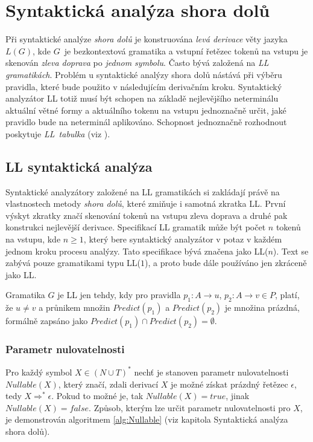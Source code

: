 \section{Syntaktická analýza shora dolů} \label{nadpisSAShoraDolu}
Při syntaktické analýze \emph{shora dolů} je konstruována \emph{levá derivace} věty jazyka $L(G)$, kde $G$~je bezkontextová gramatika a
vstupní řetězec tokenů na vstupu je skenován \emph{zleva doprava} po \emph{jednom symbolu}. Často bývá založená na \emph{LL gramatikách}.
Problém u syntaktické analýzy shora dolů nástává
při výběru pravidla, které bude použito v následujícím derivačním kroku. Syntaktický analyzátor LL totiž musí být schopen na základě nejlevějšího neterminálu
aktuální větné formy a aktuálního tokenu na vstupu jednoznačně určit, jaké pravidlo bude na neterminál aplikováno. Schopnost jednoznačně rozhodnout poskytuje
\emph{LL~tabulka} (viz \cite{Meduna:2008:ElementsOfCompilerDesign}).

\subsection*{LL syntaktická analýza}
Syntaktické analyzátory založené na LL gramatikách si zakládají právě na vlastnostech metody \emph{shora dolů}, které zmiňuje i samotná zkratka LL.
První výskyt zkratky  značí skenování tokenů na vstupu zleva doprava a druhé pak konstrukci nejlevější derivace. Specifikací LL gramatik může být
počet $n$ tokenů na vstupu, kde $n \geq 1$, který bere syntaktický analyzátor v potaz v každém jednom kroku procesu analýzy. Tato specifikace
bývá značena jako LL($n$). Text se zabývá pouze gramatikami typu LL($1$), a proto bude dále používáno jen zkráceně jako LL.
\begin{definice} \label{defLLGramatika}
  Gramatika $G$ je LL jen tehdy, kdy pro pravidla $p_1\!: A \rightarrow u$, \linebreak $p_2\!: A \rightarrow v \in P$, platí, že $u \neq v$ a průnikem množin $Predict(p_1)$
  a $Predict(p_2)$ je množina prázdná, formálně zapsáno jako $Predict(p_1) \cap Predict(p_2) = \emptyset$.
\end{definice}

\subsubsection{Parametr nulovatelnosti}
Pro každý symbol $X \in (N \cup T)^*$ nechť je stanoven parametr nulovatelnosti $Nullable(X)$, který značí, zdali derivací $X$ je možné získat prázdný řetězec $\epsilon$, tedy
$X \Rightarrow^* \epsilon$. Pokud to možné je, tak $Nullable(X) = true$, jinak $Nullable(X) = false$. Způsob, kterým lze určit parametr nulovatelnosti pro $X$, je
demonstrován algoritmem \ref{alg:Nullable} (viz \cite{IFJ:2017} kapitola Syntaktická analýza shora dolů).

